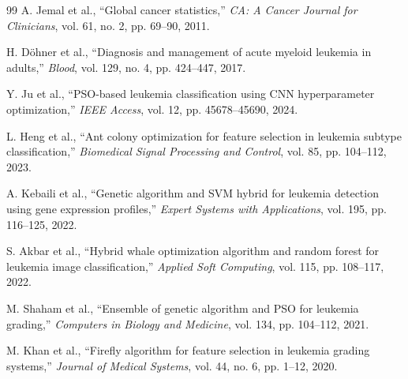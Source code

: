 \documentclass[journal]{IEEEtran}
\begin{document}
\begin{thebibliography}{99}
A. Jemal et al., ``Global cancer statistics,'' \emph{CA: A Cancer Journal for Clinicians}, vol. 61, no. 2, pp. 69--90, 2011.

H. Döhner et al., ``Diagnosis and management of acute myeloid leukemia in adults,'' \emph{Blood}, vol. 129, no. 4, pp. 424--447, 2017.

Y. Ju et al., ``PSO-based leukemia classification using CNN hyperparameter optimization,'' \emph{IEEE Access}, vol. 12, pp. 45678--45690, 2024.

L. Heng et al., ``Ant colony optimization for feature selection in leukemia subtype classification,'' \emph{Biomedical Signal Processing and Control}, vol. 85, pp. 104--112, 2023.

A. Kebaili et al., ``Genetic algorithm and SVM hybrid for leukemia detection using gene expression profiles,'' \emph{Expert Systems with Applications}, vol. 195, pp. 116--125, 2022.

S. Akbar et al., ``Hybrid whale optimization algorithm and random forest for leukemia image classification,'' \emph{Applied Soft Computing}, vol. 115, pp. 108--117, 2022.

M. Shaham et al., ``Ensemble of genetic algorithm and PSO for leukemia grading,'' \emph{Computers in Biology and Medicine}, vol. 134, pp. 104--112, 2021.

M. Khan et al., ``Firefly algorithm for feature selection in leukemia grading systems,'' \emph{Journal of Medical Systems}, vol. 44, no. 6, pp. 1--12, 2020.

\end{thebibliography}
\end{document}
